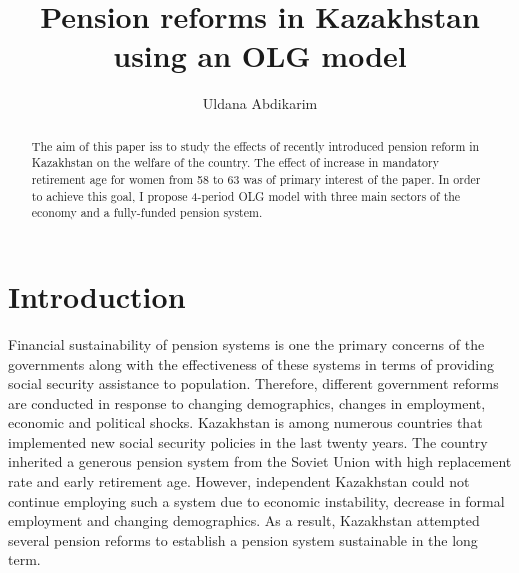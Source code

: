 \documentclass[ProjectUYA]{subfiles}
\begin{document}
\providecommand{\versn}{pdf} %
\ifthenelse{\boolean{Web}}{    %
  \renewcommand{\versn}{Web}     %
  \renewcommand{\rootFromOut}{.} %
}{}  %


\title{Pension reforms in Kazakhstan using an OLG model}

\author{Uldana Abdikarim\authNum}





\maketitle
\hypertarget{abstract}{}
\begin{abstract}
  The aim of this paper iss to study the effects of recently introduced pension reform in Kazakhstan on the welfare of the country. The effect of increase in mandatory retirement age for women from 58 to 63 was of primary interest of the paper. In order to achieve this goal, I propose 4-period OLG model with three main sectors of the economy and a fully-funded pension system.
\end{abstract}





{\titlepagefinish}


\section{Introduction}\label{sec:intro}
Financial sustainability of pension systems is one the primary concerns of the governments along with the effectiveness of these systems in terms of providing social security assistance to population. Therefore, different government reforms are conducted in response to changing demographics, changes in employment, economic and political shocks. Kazakhstan is among numerous countries that implemented new social security policies in the last twenty years. The country inherited a generous pension system from the Soviet Union with high replacement rate and early retirement age. However, independent Kazakhstan could not continue employing such a system due to economic instability, decrease in formal employment and changing demographics. As a result, Kazakhstan attempted several pension reforms to establish a pension system sustainable in the long term. 
\end{document}
